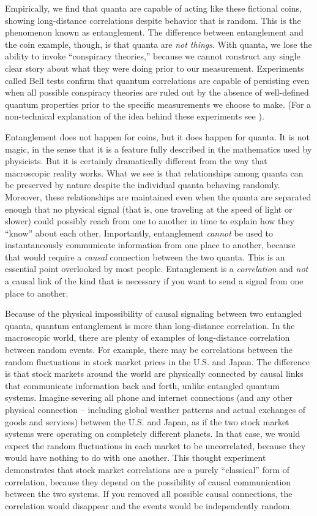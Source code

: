 \documentclass[onecolumn,preprintnumbers,amsmath,amssymbn,reprint,nofootinbib,superscriptaddress]{revtex4}    %
\begin{document}
Empirically, we find that quanta are capable of acting like these fictional coins, showing long-distance correlations despite behavior that is random.  This is the phenomenon known as entanglement.  The difference between entanglement and the coin example, though, is that quanta are {\em not things}. With quanta, we lose the ability to invoke ``conspiracy theories,'' because we cannot construct any single clear story about what they were doing prior to our measurement.  Experiments called Bell tests confirm that quantum correlations are capable of persisting even when all possible conspiracy theories are ruled out by the absence of well-defined quantum properties prior to the specific measurements we choose to make. (For a non-technical explanation of the idea behind these experiments see \cite{cakes}). 

Entanglement does not happen for coins, but it does happen for quanta.  It is not magic, in the sense that it is a feature fully described in the mathematics used by physicists.  But it is certainly dramatically different from the way that macroscopic reality works. What we see is that relationships among quanta can be preserved by nature despite the individual quanta behaving randomly.  Moreover, these relationships are maintained even when the quanta are separated enough that no physical signal (that is, one traveling at the speed of light or slower) could possibly reach from one to another in time to explain how they ``know'' about each other. Importantly, entanglement \emph{cannot} be used to instantaneously communicate  information from one place to another, because that would require a {\em causal} connection between the two quanta.  This is an essential point overlooked by most people.  Entanglement is a {\em correlation} and {\em not} a causal link of the kind that is necessary if you want to send a signal from one place to another. 

Because of the physical impossibility of causal signaling between two entangled quanta, quantum entanglement is more than long-distance correlation. In the macroscopic world, there are plenty of examples of long-distance correlation between random events.  For example, there may be correlations between the random fluctuations in stock market prices in the U.S. and Japan.  The difference is that stock markets around the world are physically connected by causal links that communicate information back and forth, unlike entangled quantum systems.  Imagine severing all phone and internet connections (and any other physical connection -- including global weather patterns and actual exchanges of goods and services) between the U.S. and Japan, as if the two stock market systems were operating on completely different planets.  In that case, we would expect the random fluctuations in each market to be uncorrelated, because they would have nothing to do with one another.  This thought experiment demonstrates that stock market correlations are a purely ``classical'' form of correlation, because they depend on the possibility of causal communication between the two systems. If you removed all possible causal connections, the correlation would disappear and the events would be independently random.  
\end{document}
